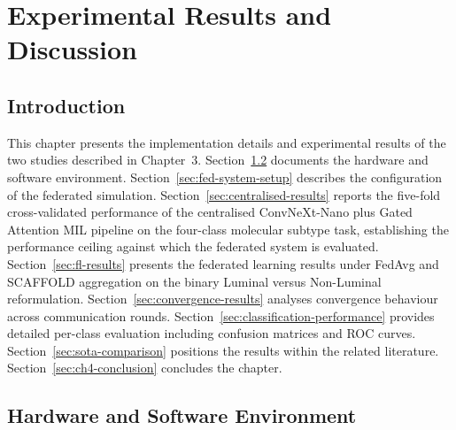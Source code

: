 %

\chapter{Experimental Results and Discussion}
\label{chap:results}

\section{Introduction}
\label{sec:ch4-intro}

This chapter presents the implementation details and experimental
results of the two studies described in Chapter~3.
Section~\ref{sec:hardware} documents the hardware and software
environment.
Section~\ref{sec:fed-system-setup} describes the configuration
of the federated simulation.
Section~\ref{sec:centralised-results} reports the five-fold
cross-validated performance of the centralised ConvNeXt-Nano
plus Gated Attention MIL pipeline on the four-class molecular
subtype task, establishing the performance ceiling against which
the federated system is evaluated.
Section~\ref{sec:fl-results} presents the federated learning
results under FedAvg and SCAFFOLD aggregation on the binary
Luminal versus Non-Luminal reformulation.
Section~\ref{sec:convergence-results} analyses convergence
behaviour across communication rounds.
Section~\ref{sec:classification-performance} provides detailed
per-class evaluation including confusion matrices and ROC curves.
Section~\ref{sec:sota-comparison} positions the results within
the related literature.
Section~\ref{sec:ch4-conclusion} concludes the chapter.


\section{Hardware and Software Environment}
\label{sec:hardware}

